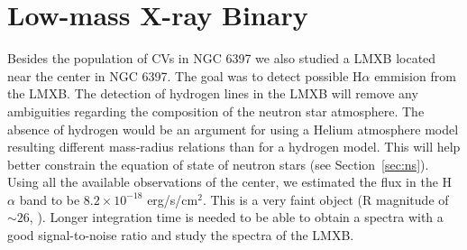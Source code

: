 \section{Low-mass X-ray Binary}


Besides the population of CVs in NGC 6397 we also studied a LMXB located near the center in NGC 6397. The goal was to detect possible H$\alpha$ emmision from the LMXB. The detection of hydrogen lines in the LMXB  will remove any ambiguities regarding the composition of the neutron star atmosphere. The absence of hydrogen  would be an argument for using a Helium atmosphere model resulting different mass-radius relations than for a hydrogen model. This will help better constrain the equation of state of neutron stars (see Section~\ref{sec:ns}). Using all the available observations of the center, we estimated the flux in the H $\alpha$ band to be $8.2 \times 10^{-18}$ erg/s/cm$^2$. This is a very faint object (R magnitude of $\sim 26$, \cite{heinke_improved_2014}). Longer integration time is needed to be able to obtain a spectra with a good signal-to-noise ratio and study the spectra of the LMXB. 

